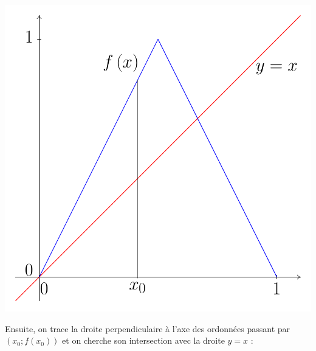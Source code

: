 \documentclass[a4paper,french,12pt]{article}
\begin{document}
\begin{center}
\includegraphics[scale=0.45]{../TeXGraph/Pdf/courbe_suite_image.pdf}
\end{center}
Ensuite, on trace la droite perpendiculaire à l'axe des ordonnées passant par $\left(x_0;f\left(x_0\right)\right)$ et on cherche son intersection avec la droite $y=x$ :
\end{document}

